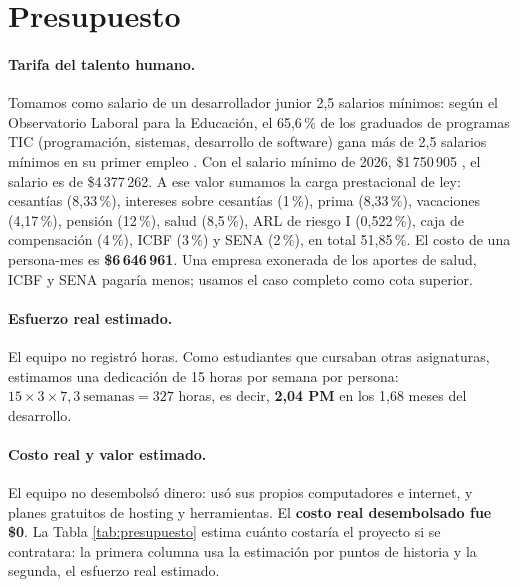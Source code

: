 \section{Presupuesto}\label{sec:presupuesto}

\paragraph{Tarifa del talento humano.} Tomamos como salario de un desarrollador junior 2,5 salarios mínimos: según el Observatorio Laboral para la Educación, el 65,6\,\% de los graduados de programas TIC (programación, sistemas, desarrollo de software) gana más de 2,5 salarios mínimos en su primer empleo \parencite{barona2026}. Con el salario mínimo de 2026, \$1\,750\,905 \parencite{decreto1470}, el salario es de \$4\,377\,262. A ese valor sumamos la carga prestacional de ley: cesantías (8,33\,\%), intereses sobre cesantías (1\,\%), prima (8,33\,\%), vacaciones (4,17\,\%), pensión (12\,\%), salud (8,5\,\%), ARL de riesgo I (0,522\,\%), caja de compensación (4\,\%), ICBF (3\,\%) y SENA (2\,\%), en total 51,85\,\%. El costo de una persona-mes es \textbf{\$6\,646\,961}. Una empresa exonerada de los aportes de salud, ICBF y SENA pagaría menos; usamos el caso completo como cota superior.

\paragraph{Esfuerzo real estimado.} El equipo no registró horas. Como estudiantes que cursaban otras asignaturas, estimamos una dedicación de 15 horas por semana por persona: $15 \times 3 \times 7{,}3\ \text{semanas} = 327$ horas, es decir, \textbf{2,04 PM} en los 1,68 meses del desarrollo.

\paragraph{Costo real y valor estimado.} El equipo no desembolsó dinero: usó sus propios computadores e internet, y planes gratuitos de hosting y herramientas. El \textbf{costo real desembolsado fue \$0}. La Tabla \ref{tab:presupuesto} estima cuánto costaría el proyecto si se contratara: la primera columna usa la estimación por puntos de historia y la segunda, el esfuerzo real estimado.

